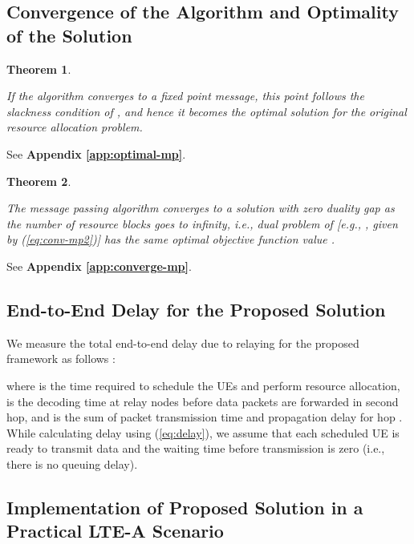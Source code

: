 \documentclass[twocolumn,10pt]{IEEEtran}
\newtheorem{theorem}{Theorem}
\begin{document}
\subsection{Convergence of the Algorithm and Optimality of the Solution}

\begin{theorem}
\label{theorem:optimal-proof-mp}

If the algorithm converges to a fixed point message, this point follows the slackness condition of , and hence it becomes the optimal solution for the original resource allocation problem.

\end{theorem}
\begin{IEEEproof}
See \textbf{Appendix \ref{app:optimal-mp}}.
\end{IEEEproof}

\begin{theorem}
\label{theorem:converge}

The message passing algorithm converges to a solution with zero duality gap as the number of resource blocks goes to infinity, i.e., dual problem of  [e.g., , given by (\ref{eq:conv-mp2})] has the same optimal objective function value \cite{mp-dft}.
\end{theorem}
\begin{IEEEproof}
See \textbf{Appendix \ref{app:converge-mp}}.
\end{IEEEproof}

\subsection{End-to-End Delay for the Proposed Solution}


We measure the total end-to-end delay due to relaying for the proposed framework as follows \cite{delay_imt}:

where   is the time required to schedule the UEs and perform resource allocation,  is the decoding time at relay nodes before data packets are forwarded in second hop, and  is the sum of packet transmission time and propagation delay for hop . While calculating delay using  (\ref{eq:delay}), we assume that each scheduled UE is ready to transmit data and the waiting time before transmission is zero (i.e., there is no queuing delay).

\subsection{Implementation of Proposed Solution in a Practical LTE-A Scenario}
\end{document}
